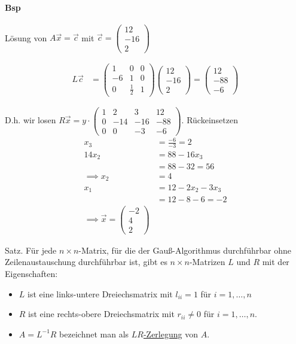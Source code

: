 \documentclass[a4paper,ngerman]{scrbook}
\begin{document}
\paragraph{Bsp}

Lösung von $A\vec{x} = \vec{c}$ mit $\vec{c} =
\begin{pmatrix}
  12\\ -16\\ 2
\end{pmatrix}$

\begin{align*}
  L\vec{c} &=
  \begin{pmatrix}
    1 & 0 & 0\\
    -6 & 1 & 0\\
    0 & \frac{1}{2} & 1
  \end{pmatrix}
  \begin{pmatrix}
    12\\ -16\\ 2
  \end{pmatrix}
  =
  \begin{pmatrix}
    12 \\ -88\\ -6
  \end{pmatrix}
\end{align*}

D.h\@. wir losen $R\vec{x} = y\cdot
\begin{pmatrix}
  1 & 2 & 3 & 12\\
  0 & -14 & -16 & -88 \\
  0 & 0 & -3 & -6
\end{pmatrix}$. Rückeinsetzen
\begin{align*}
  x_3 &= \frac{-6}{-3} = 2\\
  14x_2 &= 88 - 16x_3\\
  &= 88 - 32 = 56\\
  \implies x_2 &= 4\\
  x_1 &= 12 - 2x_2 - 3x_3\\
  &= 12 - 8 - 6 = -2\\
  \implies \vec{x} =
  \begin{pmatrix}
    -2\\ 4\\ 2
  \end{pmatrix}
\end{align*}

Satz. Für jede $n \times n$-Matrix, für die der Gauß-Algorithmus durchführbar ohne Zeilenaustauschung durchführbar ist, gibt es $n\times n$-Matrizen $L$ und $R$ mit der Eigenschaften:
\begin{itemize}
\item $L$ ist eine links-untere Dreiechsmatrix mit $l_{ii} = 1$ für $i=1,\dots,n$
\item $R$ ist eine rechts-obere Dreiechsmatrix mit $r_{ii} \neq 0$ für $i=1,\dots,n$.
\item $A = L^{-1}R$ bezeichnet man als \underline{$LR$-Zerlegung} von $A$.
\end{itemize}
\end{document}
